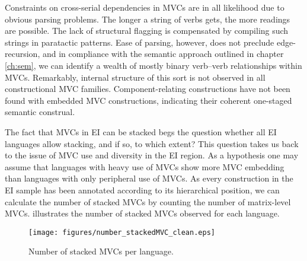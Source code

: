 Constraints on cross-serial dependencies in MVCs are in all likelihood due to obvious parsing problems. The longer a string of verbs gets, the more readings are possible. The lack of structural flagging is compensated by compiling such strings in paratactic patterns. Ease of parsing, however, does not preclude edge-recursion, and in compliance with the semantic approach outlined in chapter \ref{ch:sem}, we can identify a wealth of mostly binary verb--verb relationships within MVCs. Remarkably, internal structure of this sort is not observed in all constructional MVC families. Component-relating constructions have not been found with embedded MVC constructions, indicating their coherent one-staged semantic construal.

The fact that MVCs in EI can be stacked begs the question whether all EI languages allow stacking, and if so, to which extent? This question takes us back to the issue of MVC use and diversity in the EI region. As a hypothesis one may assume that languages with heavy use of MVCs show more MVC embedding than languages with only peripheral use of MVCs. As every construction in the EI sample has been annotated according to its hierarchical position, we can calculate the number of stacked MVCs by counting the number of matrix-level MVCs.  illustrates the number of stacked MVCs observed for each language.

\begin{figure}[p]
\texttt{[image: figures/number\_stackedMVC\_clean.eps]}
\caption[Number of stacked MVCs per language]{Number of stacked MVCs per language.}\label{fig:stacked}
\end{figure}

